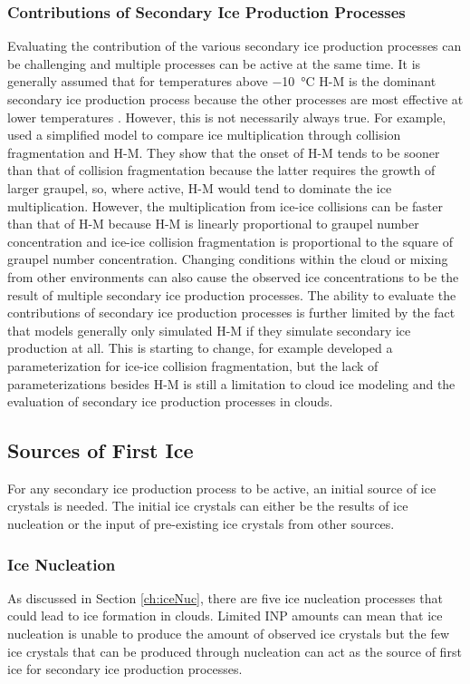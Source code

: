 \subsubsection{Contributions of Secondary Ice Production Processes}
Evaluating the contribution of the various secondary ice production processes can be challenging and multiple processes can be active at the same time. It is generally assumed that for temperatures above \SI{-10}{\degreeCelsius} H-M is the dominant secondary ice production process because the other processes are most effective at lower temperatures \citep{oshea2017}. However, this is not necessarily always true. For example, \cite{yano2011} used a simplified model to compare ice multiplication through collision fragmentation and H-M. They show that the onset of H-M tends to be sooner than that of collision fragmentation because the latter requires the growth of larger graupel, so, where active, H-M would tend to dominate the ice multiplication. However, the multiplication from ice-ice collisions can be faster than that of H-M because H-M is linearly proportional to graupel number concentration and ice-ice collision fragmentation is proportional to the square of graupel number concentration. Changing conditions within the cloud or mixing from other environments can also cause the observed ice concentrations to be the result of multiple secondary ice production processes. The ability to evaluate the contributions of secondary ice production processes is further limited by the fact that models generally only simulated H-M if they simulate secondary ice production at all. This is starting to change, for example \cite{soti2021} developed a parameterization for ice-ice collision fragmentation, but the lack of parameterizations besides H-M is still a limitation to cloud ice modeling and the evaluation of secondary ice production processes in clouds.

\subsection{Sources of First Ice}
For any secondary ice production process to be active, an initial source of ice crystals is needed. The initial ice crystals can either be the results of ice nucleation or the input of pre-existing ice crystals from other sources.

\subsubsection{Ice Nucleation}
As discussed in Section \ref{ch:iceNuc}, there are five ice nucleation processes that could lead to ice formation in clouds. Limited INP amounts can mean that ice nucleation is unable to produce the amount of observed ice crystals but the few ice crystals that can be produced through nucleation can act as the source of first ice for secondary ice production processes.

